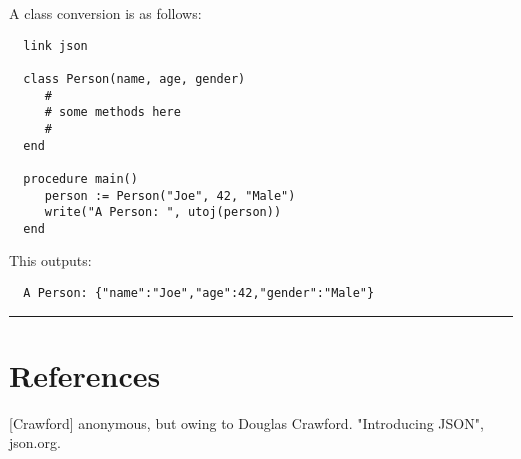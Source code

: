 \documentclass[letterpaper,12pt]{article}
\begin{document}
\begin{description}
A class conversion is as follows:

  \begin{verbatim}
  link json

  class Person(name, age, gender)
     #
     # some methods here
     #
  end

  procedure main()
     person := Person("Joe", 42, "Male")
     write("A Person: ", utoj(person))
  end
  \end{verbatim}

This outputs:

  \begin{verbatim}
  A Person: {"name":"Joe","age":42,"gender":"Male"}
  \end{verbatim}


\end{description}

\noindent\rule{\textwidth}{1pt}

\section*{References}

[Crawford] anonymous, but owing to Douglas Crawford.
"Introducing JSON", json.org.
\end{document}
